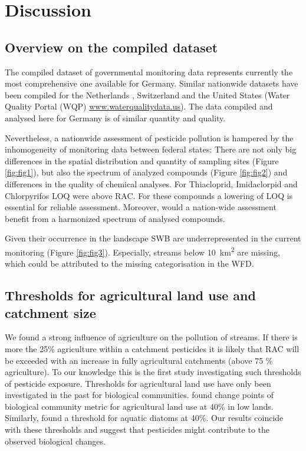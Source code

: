\documentclass[journal=esthag,manuscript=article]{achemso}
\begin{document}
\section{Discussion}
\subsection{Overview on the compiled dataset}
The compiled dataset of governmental monitoring data represents currently the most comprehensive one available for Germany.
Similar nationwide datasets have been compiled for the Netherlands \citep{vijver_spatial_2008}, Switzerland \citep{munz_pestizidmessungen_2011} and the United States (Water Quality Portal (WQP) \url{www.waterqualitydata.us}).
The data compiled and analysed here for Germany is of similar quantity and quality.

Nevertheless, a nationwide assessment of pesticide pollution is hampered by the inhomogeneity of monitoring data between federal states:
There are not only big differences in the spatial distribution and quantity of sampling sites (Figure \ref{fig:fig1}), but also the spectrum of analyzed compounds (Figure \ref{fig:fig2}) and differences in the quality of chemical analyses. 
For Thiacloprid, Imidaclorpid and Chlorpyrifos LOQ were above RAC.
For these compounds a lowering of LOQ is essential for reliable assessment.
Moreover, would a nation-wide assessment benefit from a harmonized spectrum of analysed compounds.

Given their occurrence in the landscape \citep{nadeau_hydrological_2007} SWB are underrepresented in the current monitoring (Figure \ref{fig:fig3}). 
Especially, streams below 10~km\textsuperscript{2} are missing, which could be attributed to the missing categorisation in the WFD. 



\subsection{Thresholds for agricultural land use and catchment size}
We found a strong influence of agriculture on the pollution of streams.
If there is more the 25\% agriculture within a catchment pesticides it is likely that RAC will be exceeded with an increase in fully agricultural catchments (above 75 \% agriculture).
To our knowledge this is the first study investigating such thresholds of pesticide exposure.
Thresholds for agricultural land use have only been investigated in the past for biological communities.
\citet{feld_response_2013} found change points of biological community metric for agricultural land use at 40\% in low lands. 
Similarly, \citet{waite_agricultural_2014} found a threshold for aquatic diatoms at 40\%.
Our results coincide with these thresholds and suggest that pesticides might contribute to the observed biological changes. 
\end{document}
